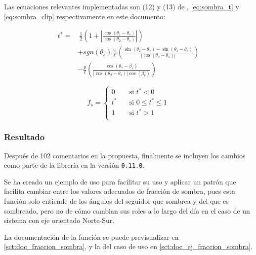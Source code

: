 Las ecuaciones relevantes implementadas son (12) y (13) de \cite{Anderson_Jensen_2024}, \ref{eq:sombra_t} y \ref{eq:sombra_clip} respectivamente en este documento:

\begin{equation} \label{eq:sombra_t}
    \begin{aligned}
        t^* = & \ \frac{1}{2} \left( 1 + \left|\frac{\cos(\theta_1 - \theta_s)}{\cos(\theta_2 - \theta_s)}\right| \right)                                            \\
              & + sgn(\theta_s) \frac{z_0}{\ell} \left( \frac{\sin(\theta_2 - \theta_s) - \sin(\theta_1 - \theta_s)}{\left|\cos(\theta_2 - \theta_s)\right|} \right) \\
              & - \frac{p}{\ell} \left( \frac{\cos(\theta_s - \beta_c)}{\left|\cos(\theta_2 - \theta_s)\right| \cos(\beta_c)} \right)
    \end{aligned}
\end{equation}

\begin{equation} \label{eq:sombra_clip}
    f_s =
    \begin{cases}
        0   & \quad \text{si } t^* < 0           \\
        t^* & \quad \text{si } 0 \leq t^* \leq 1 \\
        1   & \quad \text{si } t^* > 1           \\
    \end{cases}
\end{equation}

\subsubsection{Resultado}

Después de 102 comentarios en la propuesta, finalmente se incluyen los cambios como parte de la librería en la versión \texttt{0.11.0}.

Se ha creado un ejemplo de uso para facilitar su uso y aplicar un patrón que facilita cambiar entre los valores adecuados de fracción de sombra, pues esta función solo entiende de los ángulos del seguidor que sombrea y del que es sombreado, pero no de cómo cambian sus roles a lo largo del día en el caso de un sistema con eje orientado Norte-Sur.

La documentación de la función se puede previsualizar en \ref{sct:doc_fraccion_sombra}, y la del caso de uso en \ref{sct:doc_ej_fraccion_sombra}.

